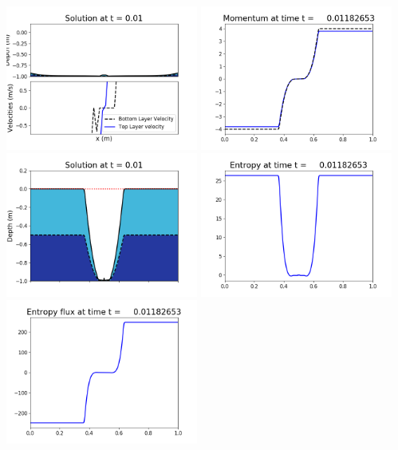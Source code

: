 \documentclass[11pt]{article}
\begin{document}
\includegraphics[width=0.475\textwidth]{frame0074fig1002.png}
\vskip 10pt 
\includegraphics[width=0.475\textwidth]{frame0074fig1003.png}
\includegraphics[width=0.475\textwidth]{frame0074fig1006.png}
\vskip 10pt 
\includegraphics[width=0.475\textwidth]{frame0074fig1007.png}
\includegraphics[width=0.475\textwidth]{frame0074fig1008.png}
\end{document}
